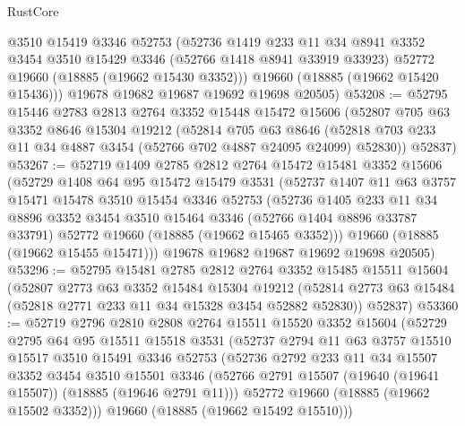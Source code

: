 \begin{lexlean}{RustCore}
\begin{coremodule}
        @3510
        @15419
        @3346
        @52753
        (@52736
          @1419
          @233
          @11
          @34
          @8941
          @3352
          @3454
          @3510
          @15429
          @3346
          (@52766 @1418 @8941 @33919 @33923)
          @52772
          @19660
          (@18885 (@19662 @15430 @3352)))
        @19660
        (@18885 (@19662 @15420 @15436)))
      @19678
      @19682
      @19687
      @19692
      @19698
      @20505)
@53208 := @52795
    @15446
    @2783
    @2813
    @2764
    @3352
    @15448
    @15472
    @15606
    (@52807
      @705
      @63
      @3352
      @8646
      @15304
      @19212
      (@52814
        @705
        @63
        @8646
        (@52818 @703 @233 @11 @34 @4887 @3454 (@52766 @702 @4887 @24095 @24099) @52830))
      @52837)
@53267 := @52719
    @1409
    @2785
    @2812
    @2764
    @15472
    @15481
    @3352
    @15606
    (@52729
      @1408
      @64
      @95
      @15472
      @15479
      @3531
      (@52737
        @1407
        @11
        @63
        @3757
        @15471
        @15478
        @3510
        @15454
        @3346
        @52753
        (@52736
          @1405
          @233
          @11
          @34
          @8896
          @3352
          @3454
          @3510
          @15464
          @3346
          (@52766 @1404 @8896 @33787 @33791)
          @52772
          @19660
          (@18885 (@19662 @15465 @3352)))
        @19660
        (@18885 (@19662 @15455 @15471)))
      @19678
      @19682
      @19687
      @19692
      @19698
      @20505)
@53296 := @52795
    @15481
    @2785
    @2812
    @2764
    @3352
    @15485
    @15511
    @15604
    (@52807
      @2773
      @63
      @3352
      @15484
      @15304
      @19212
      (@52814 @2773 @63 @15484 (@52818 @2771 @233 @11 @34 @15328 @3454 @52882 @52830))
      @52837)
@53360 := @52719
    @2796
    @2810
    @2808
    @2764
    @15511
    @15520
    @3352
    @15604
    (@52729
      @2795
      @64
      @95
      @15511
      @15518
      @3531
      (@52737
        @2794
        @11
        @63
        @3757
        @15510
        @15517
        @3510
        @15491
        @3346
        @52753
        (@52736
          @2792
          @233
          @11
          @34
          @15507
          @3352
          @3454
          @3510
          @15501
          @3346
          (@52766 @2791 @15507 (@19640 (@19641 @15507)) (@18885 (@19646 @2791 @11)))
          @52772
          @19660
          (@18885 (@19662 @15502 @3352)))
        @19660
        (@18885 (@19662 @15492 @15510)))

\end{coremodule}
\end{lexlean}
